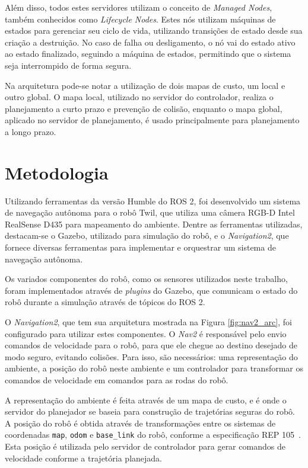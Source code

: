 \documentclass[repeatfields,xlists,xpacks,oneside,yearsonly]{ufrgscca}
\begin{document}
Além disso, todos estes servidores utilizam o conceito de
\textit{Managed Nodes}, também conhecidos como \textit{Lifecycle
    Nodes}. Estes nós utilizam máquinas de estados para gerenciar seu
ciclo de vida, utilizando transições de estado desde sua criação a
destruição. No caso de falha ou desligamento, o nó vai do estado
ativo ao estado finalizado, seguindo a máquina de estados, permitindo
que o sistema seja interrompido de forma segura.

Na arquitetura pode-se notar a utilização de dois mapas de custo, um
local e outro global. O mapa local, utilizado no servidor do
controlador, realiza o planejamento a curto prazo e prevenção de
colisão, enquanto o mapa global, aplicado no servidor de
planejamento, é usado principalmente para planejamento a longo prazo.

\chapter{Metodologia}
\label{desenvolvimento}

Utilizando ferramentas da versão Humble do ROS 2, foi desenvolvido um
sistema de navegação autônoma para o robô Twil, que utiliza uma
câmera RGB-D Intel RealSense D435 para mapeamento do ambiente. Dentre
as ferramentas utilizadas, destacam-se o Gazebo, utilizado para
simulação do robô, e o \textit{Navigation2}, que fornece diversas
ferramentas para implementar e orquestrar um sistema de navegação
autônoma.

Os variados componentes do robô, como os sensores utilizados neste
trabalho, foram implementados através de \textit{plugins} do Gazebo,
que comunicam o estado do robô durante a simulação através de tópicos
do ROS 2.

O \textit{Navigation2}, que tem sua arquitetura mostrada na Figura
\ref{fig:nav2_arc}, foi configurado para utilizar estes componentes.
O \textit{Nav2} é responsável pelo envio comandos de velocidade para
o robô, para que ele chegue ao destino desejado de modo seguro,
evitando colisões. Para isso, são necessários: uma representação do
ambiente, a posição do robô neste ambiente e um controlador para
transformar os comandos de velocidade em comandos para as rodas do
robô.

A representação do ambiente é feita através de um mapa de custo, e é
onde o servidor do planejador se baseia para construção de
trajetórias seguras do robô. A posição do robô é obtida através de
transformações entre os sistemas de coordenadas \texttt{map},
\texttt{odom} e \texttt{base\_link} do robô, conforme a especificação
REP 105~\cite{rep_105}. Esta posição é utilizada pelo servidor de
controlador para gerar comandos de velocidade conforme a trajetória
planejada.
\end{document}
